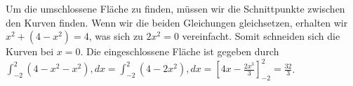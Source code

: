 Um die umschlossene Fläche zu finden, müssen wir die Schnittpunkte zwischen den Kurven finden. 
Wenn wir die beiden Gleichungen gleichsetzen, erhalten wir $x^2 + (4 - x^2) = 4$, was sich zu $2x^2 = 0$ vereinfacht. 
Somit schneiden sich die Kurven bei $x = 0$.
Die eingeschlossene Fläche ist gegeben durch $\int_{-2}^{2} (4 - x^2 - x^2), dx = \int_{-2}^{2} (4 - 2x^2), dx = \left[4x - \frac{2x^3}{3}\right]_{-2}^{2} = \frac{32}{3}$.
